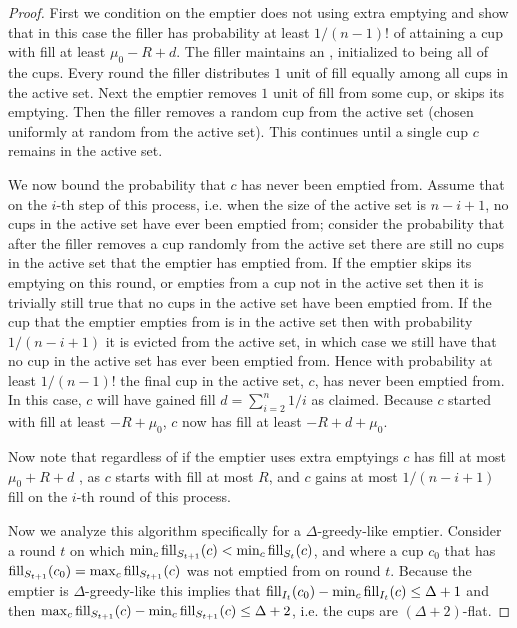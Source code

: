 \begin{proof}
  First we condition on the emptier does not using extra emptying
  and show that in this case the filler has probability at least
  $1/(n-1)!$ of attaining a cup with fill at least $\mu_0 -R +d$.
  The filler maintains an , initialized to being
  all of the cups. Every round the filler distributes $1$ unit of
  fill equally among all cups in the active set. Next the emptier
  removes $1$ unit of fill from some cup, or skips its emptying.
  Then the filler removes a random cup from the active set
  (chosen uniformly at random from the active set). This
  continues until a single cup $c$ remains in the active set. 

  We now bound the probability that $c$ has never been emptied
  from. Assume that on the $i$-th step of this process, i.e. when
  the size of the active set is $n-i+1$, no cups in the active
  set have ever been emptied from; consider the probability that
  after the filler removes a cup randomly from the active set
  there are still no cups in the active set that the emptier has
  emptied from. If the emptier skips its emptying on this round,
  or empties from a cup not in the active set then it is
  trivially still true that no cups in the active set have been
  emptied from. If the cup that the emptier empties from is in
  the active set then with probability $1/(n-i+1)$ it is evicted
  from the active set, in which case we still have that no
  cup in the active set has ever been emptied from. Hence with
  probability at least $1/(n-1)!$ the final cup in the
  active set, $c$, has never been emptied from. In this case, $c$
  will have gained fill $d=\sum_{i=2}^n 1/i$ as claimed. Because
  $c$ started with fill at least $-R+\mu_0$, $c$ now has fill at
  least $-R+ d+\mu_0$. 

  Now note that regardless of if the emptier uses extra emptyings
  $c$ has fill at most $\mu_0 + R + d$ , as $c$ starts with fill
  at most $R$, and $c$ gains at most $1/(n-i+1)$ fill on the
  $i$-th round of this process. 

  Now we analyze this algorithm specifically for a
  $\Delta$-greedy-like emptier. Consider a round $t$ on which
  $\min_c \operatorname{\textnormal{fill}}_{S_{t+1}}(c) < \min_c \operatorname{\textnormal{fill}}_{S_{t}}(c)$, and where a cup
  $c_0$ that has $\operatorname{\textnormal{fill}}_{S_{t+1}}(c_0) = \max_{c}
  \operatorname{\textnormal{fill}}_{S_{t+1}}(c)$ was not emptied from on round $t$. Because
  the emptier is $\Delta$-greedy-like this
  implies that $\operatorname{\textnormal{fill}}_{I_t}(c_0) - \min_c \operatorname{\textnormal{fill}}_{I_t}(c) \le \Delta
  + 1$ and then $\max_c \operatorname{\textnormal{fill}}_{S_{t+1}}(c) - \min_c
  \operatorname{\textnormal{fill}}_{S_{t+1}}(c) \le \Delta + 2$, i.e. the cups are $(\Delta +
  2)$-flat. 


\end{proof}

